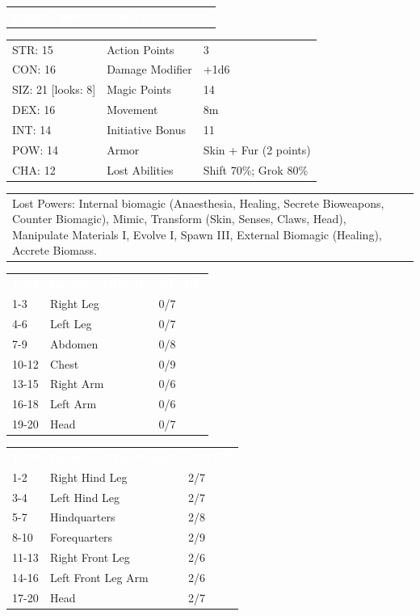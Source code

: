 \documentclass[letterpaper,serif]{rpg-module}
\begin{document}
\noindent\begin{tabularx}{\linewidth}{X}
\rowcolor{gray}
\textcolor{white}{\textbf{Edgar - Journeyman Lost Assassin}}
\end{tabularx}
\begin{tabularx}{\linewidth}{XXX}
STR: 15 & Action Points & 3 \\
CON: 16 & Damage Modifier & +1d6 \\
SIZ: 21 [looks: 8] & Magic Points & 14 \\
DEX: 16 & Movement & 8m \\
INT: 14 & Initiative Bonus & 11 \\
POW: 14 & Armor & Skin + Fur (2 points) \\
CHA: 12 & Lost Abilities & Shift 70\%; Grok 80\% \\
\end{tabularx}
\begin{tabularx}{\linewidth}{XXX}
Lost Powers: Internal biomagic (Anaesthesia, Healing, Secrete Bioweapons, Counter Biomagic), Mimic, Transform (Skin, Senses, Claws, Head), Manipulate Materials I, Evolve I, Spawn III, External Biomagic (Healing), Accrete Biomass. 
\end{tabularx}

\begin{tabularx}{\linewidth}{XXX}
\rowcolor{gray}
\textcolor{white}{\textbf{1d20}} & \textcolor{white}{\textbf{Location (Biped)}} & \textcolor{white}{\textbf{AP/HP}} \\
1-3 & Right Leg & 0/7 \\
4-6 & Left Leg & 0/7 \\
7-9 & Abdomen & 0/8 \\
10-12 & Chest & 0/9 \\
13-15 & Right Arm & 0/6 \\
16-18 & Left Arm & 0/6 \\
19-20 & Head & 0/7 
\end{tabularx}
\begin{tabularx}{\linewidth}{XXX}
\rowcolor{gray}
\textcolor{white}{\textbf{1d20}} & \textcolor{white}{\textbf{Location (Quadroped)}} & \textcolor{white}{\textbf{AP/HP}} \\
1-2 & Right Hind Leg & 2/7 \\
3-4 & Left Hind Leg & 2/7 \\
5-7 & Hindquarters & 2/8 \\
8-10 & Forequarters & 2/9 \\
11-13 & Right Front Leg & 2/6 \\
14-16 & Left Front Leg Arm & 2/6 \\
17-20 & Head & 2/7 
\end{tabularx}
\end{document}
